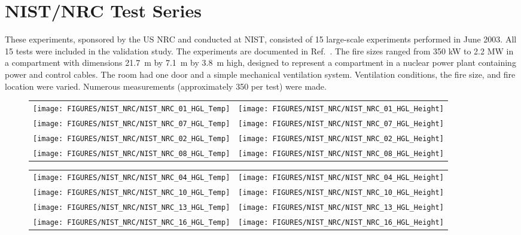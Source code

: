 \clearpage

\section{NIST/NRC Test Series}

These experiments, sponsored by the US NRC and conducted at NIST, consisted of 15 large-scale experiments performed in June 2003. All 15 tests were included in the validation study. The experiments are documented in Ref.~\cite{Hamins:2005}. The fire sizes ranged from 350 kW to 2.2 MW in a compartment with dimensions 21.7~m by 7.1~m by 3.8~m high, designed to represent a compartment in a nuclear power plant containing power and control cables. The room had one door and a simple mechanical ventilation system. Ventilation conditions, the fire size, and fire location were varied. Numerous measurements (approximately 350 per test) were made.

\begin{figure}[p]
\begin{tabular*}{\textwidth}{l@{\extracolsep{\fill}}r}
\texttt{[image: FIGURES/NIST\_NRC/NIST\_NRC\_01\_HGL\_Temp]} &
\texttt{[image: FIGURES/NIST\_NRC/NIST\_NRC\_01\_HGL\_Height]} \\
\texttt{[image: FIGURES/NIST\_NRC/NIST\_NRC\_07\_HGL\_Temp]} &
\texttt{[image: FIGURES/NIST\_NRC/NIST\_NRC\_07\_HGL\_Height]} \\
\texttt{[image: FIGURES/NIST\_NRC/NIST\_NRC\_02\_HGL\_Temp]} &
\texttt{[image: FIGURES/NIST\_NRC/NIST\_NRC\_02\_HGL\_Height]} \\
\texttt{[image: FIGURES/NIST\_NRC/NIST\_NRC\_08\_HGL\_Temp]} &
\texttt{[image: FIGURES/NIST\_NRC/NIST\_NRC\_08\_HGL\_Height]}
\end{tabular*}
\end{figure}

\begin{figure}[p]
\begin{tabular*}{\textwidth}{l@{\extracolsep{\fill}}r}
\texttt{[image: FIGURES/NIST\_NRC/NIST\_NRC\_04\_HGL\_Temp]} &
\texttt{[image: FIGURES/NIST\_NRC/NIST\_NRC\_04\_HGL\_Height]} \\
\texttt{[image: FIGURES/NIST\_NRC/NIST\_NRC\_10\_HGL\_Temp]} &
\texttt{[image: FIGURES/NIST\_NRC/NIST\_NRC\_10\_HGL\_Height]} \\
\texttt{[image: FIGURES/NIST\_NRC/NIST\_NRC\_13\_HGL\_Temp]} &
\texttt{[image: FIGURES/NIST\_NRC/NIST\_NRC\_13\_HGL\_Height]} \\
\texttt{[image: FIGURES/NIST\_NRC/NIST\_NRC\_16\_HGL\_Temp]} &
\texttt{[image: FIGURES/NIST\_NRC/NIST\_NRC\_16\_HGL\_Height]}
\end{tabular*}
\end{figure}

